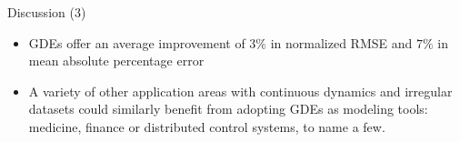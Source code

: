 \documentclass{beamer}
\begin{document}
\begin{frame}{Discussion (3)}
\begin{itemize}
\item GDEs offer an average improvement of $3\%$ in normalized RMSE and $7\%$ in mean absolute percentage error
\item A variety of other application areas with continuous dynamics and irregular datasets could similarly benefit from adopting GDEs as modeling tools: medicine, finance or distributed control systems, to name a few.
\end{itemize}
\end{frame}
\end{document}
